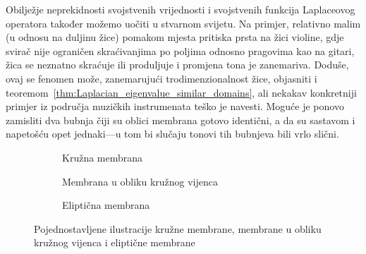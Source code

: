 \par

Obilježje neprekidnosti svojstvenih vrijednosti i svojstvenih funkcija Laplaceovog operatora također možemo uočiti u stvarnom svijetu. Na primjer, relativno malim (u odnosu na duljinu žice) pomakom mjesta pritiska prsta na žici violine, gdje svirač nije ograničen skraćivanjima po poljima odnosno pragovima kao na gitari, žica se neznatno skraćuje ili produljuje i promjena tona je zanemariva. Doduše, ovaj se fenomen može, zanemarujući trodimenzionalnost žice, objasniti i teoremom~\ref{thm:Laplacian_eigenvalue_similar_domains}, ali nekakav konkretniji primjer iz područja muzičkih instrumenata teško je navesti. Moguće je ponovo zamisliti dva bubnja čiji su oblici membrana gotovo identični, a da su sastavom i napetošću opet jednaki---u tom bi slučaju tonovi tih bubnjeva bili vrlo slični.

\par

\begin{figure}[htb!]
    \centering
    \begin{subfigure}{0.3\textwidth}
        \centering
        \caption{Kružna membrana}
        \label{fig:membranes_circle}
    \end{subfigure}
    \begin{subfigure}{0.3\textwidth}
        \centering
        \caption{Membrana u obliku kružnog vijenca}
        \label{fig:membranes_annulus}
    \end{subfigure}
    \begin{subfigure}{0.3\textwidth}
        \centering
        \caption{Eliptična membrana}
        \label{fig:membranes_ellipse}
    \end{subfigure}
    \caption{Pojednostavljene ilustracije kružne membrane, membrane u obliku kružnog vijenca i eliptične membrane}
    \label{fig:membranes}
\end{figure}

